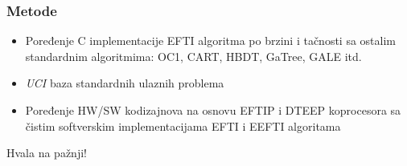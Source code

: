 \documentclass{beamer}
\begin{document}

\begin{frame}
\frametitle{Metode}
\begin{itemize}
\setlength{\itemsep}{\fill}
\item Poređenje C implementacije EFTI algoritma po brzini i tačnosti sa ostalim standardnim algoritmima: OC1, CART, HBDT, GaTree, GALE itd.
\item \emph{UCI} baza standardnih ulaznih problema
\item Poređenje HW/SW kodizajnova na osnovu EFTIP i DTEEP koprocesora sa čistim softverskim implementacijama EFTI i EEFTI algoritama
\end{itemize}
\end{frame}


\begin{frame}
\Huge{\centerline{Hvala na pažnji!}}
\end{frame}

\end{document}
